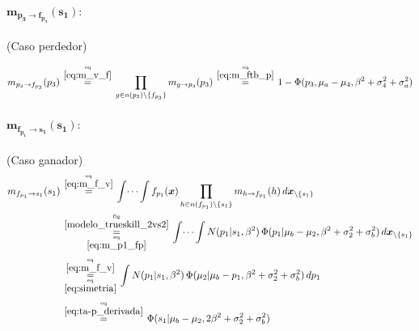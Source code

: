 \documentclass[article]{jss}
\newcommand\hfrac[2]{\genfrac{}{}{0pt}{}{#1}{#2}} %
\begin{document}
\begin{appendix}
\paragraph{$\bm{m_{p_3 \rightarrow f_{p_3}}(s_1)}:$} (Caso perdedor)

\begin{equation}\label{eq:m_p3_fp}
\begin{split}
 m_{p_3 \rightarrow f_{p_3}}(p_3) \overset{\hfrac{\text{eq}}{\ref{eq:m_v_f}}}{=} \prod_{g \in n(p_3) \setminus  \{f_{p_3} \}} m_{g \rightarrow p_3} (p_3)  \overset{\hfrac{\text{eq}}{\ref{eq:m_ftb_p}}}{=}  1 - \Phi(p_3, \mu_a  - \mu_4, \beta^2 + \sigma_4^2 + \sigma_a^2)
\end{split}
\end{equation}

\paragraph{$\bm{m_{f_{p_1} \rightarrow s_1}(s_1)}:$} (Caso ganador)
\begin{equation}\label{eq:m_fp_s1}
\begin{split}
m_{f_{p_1} \rightarrow s_1}(s_1) & \overset{\hfrac{\text{eq}}{\ref{eq:m_f_v}}}{=} \int \dots \int f_{p_1}(\bm{x}) \prod_{h \in n(f_{p_1}) \setminus \{s_1\} } m_{h \rightarrow f_{p_1}}(h) \, d\bm{x}_{\setminus \{s_1\} }  \\
&\overset{\hfrac{\text{fig}}{\ref{modelo_trueskill_2vs2}}}{\underset{\hfrac{\text{eq}}{\ref{eq:m_p1_fp}}}{=}} \int \dots \int N(p_1| s_1, \beta^2) \, \Phi(p_1| \mu_b - \mu_2, \beta^2 + \sigma_2^2 + \sigma_b^2 ) \, d\bm{x}_{\setminus \{s_1\} }
\\[0.1cm]
& \overset{\hfrac{\text{eq}}{\ref{eq:m_f_v}}}{\underset{\hfrac{\text{eq}}{\ref{eq:simetria}}}{=}} \int N(p_1| s_1, \beta^2) \, \Phi(\mu_2| \mu_b -  p_1, \beta^2 + \sigma_2^2 + \sigma_b^2) \, dp_1 \\[0.1cm]
&\overset{\hfrac{\text{eq}}{\ref{eq:ta-p_derivada}}}{=} \Phi(s_1| \mu_b - \mu_2, 2\beta^2 + \sigma_2^2 + \sigma_b^2)
\end{split}
\end{equation}


\end{appendix}
\end{document}
